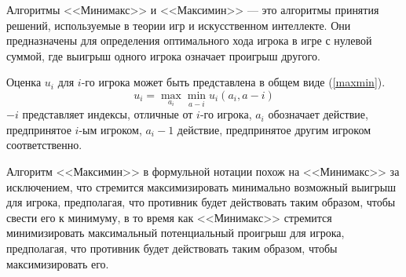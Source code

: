 Алгоритмы <<Минимакс>> и <<Максимин>> --- это алгоритмы принятия решений, используемые в теории игр и искусственном интеллекте. Они предназначены для определения оптимального хода игрока в игре с нулевой суммой, где выигрыш одного игрока означает проигрыш другого.

Оценка $u_i$ для $i$-го игрока может быть представлена в общем виде (\ref{maxmin}).
\begin{equation}\label{maxmin}
    u_i = \max_{a_i} \min_{a - i} u_i(a_i, a - i)
\end{equation}
$-i$ представляет индексы, отличные от $i$-го игрока, $a_i$ обозначает действие, предпринятое $i$-ым игроком, $a_i - 1$ действие, предпринятое другим игроком соответственно.

Алгоритм <<Максимин>> в формульной нотации похож на <<Минимакс>> за исключением, что стремится максимизировать минимально возможный выигрыш для игрока, предполагая, что противник будет действовать таким образом, чтобы свести его к минимуму, в то время как <<Минимакс>> стремится минимизировать максимальный потенциальный проигрыш для игрока, предполагая, что противник будет действовать таким образом, чтобы максимизировать его.

